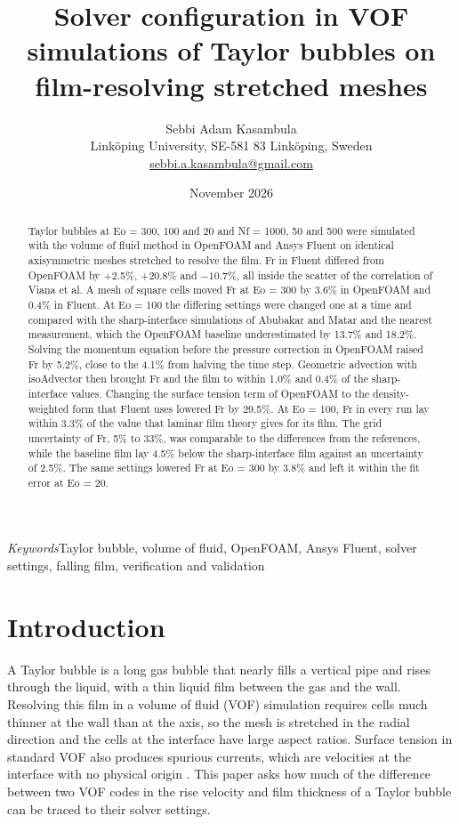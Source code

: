 \documentclass[11pt,a4paper]{article}
\title{Solver configuration in VOF simulations of Taylor bubbles on film-resolving stretched meshes}
\author{Sebbi Adam Kasambula\\[3pt]
{\normalsize Link\"oping University, SE-581 83 Link\"oping, Sweden}\\[1pt]
{\normalsize \href{mailto:sebbi.a.kasambula@gmail.com}{sebbi.a.kasambula@gmail.com}}}
\date{November 2026}
\begin{document}
\maketitle

\begin{abstract}
Taylor bubbles at Eo = 300, 100 and 20 and Nf = 1000, 50 and 500 were simulated with the volume of fluid method in OpenFOAM and Ansys Fluent on identical axisymmetric meshes stretched to resolve the film. Fr in Fluent differed from OpenFOAM by +2.5\%, +20.8\% and $-10.7\%$, all inside the scatter of the correlation of Viana et al. A mesh of square cells moved Fr at Eo = 300 by 3.6\% in OpenFOAM and 0.4\% in Fluent. At Eo = 100 the differing settings were changed one at a time and compared with the sharp-interface simulations of Abubakar and Matar and the nearest measurement, which the OpenFOAM baseline underestimated by 13.7\% and 18.2\%. Solving the momentum equation before the pressure correction in OpenFOAM raised Fr by 5.2\%, close to the 4.1\% from halving the time step. Geometric advection with isoAdvector then brought Fr and the film to within 1.0\% and 0.4\% of the sharp-interface values. Changing the surface tension term of OpenFOAM to the density-weighted form that Fluent uses lowered Fr by 29.5\%. At Eo = 100, Fr in every run lay within 3.3\% of the value that laminar film theory gives for its film. The grid uncertainty of Fr, 5\% to 33\%, was comparable to the differences from the references, while the baseline film lay 4.5\% below the sharp-interface film against an uncertainty of 2.5\%. The same settings lowered Fr at Eo = 300 by 3.8\% and left it within the fit error at Eo = 20.
\end{abstract}

\noindent\textit{Keywords}\quad Taylor bubble, volume of fluid, OpenFOAM, Ansys Fluent, solver settings, falling film, verification and validation

\section{Introduction}

A Taylor bubble is a long gas bubble that nearly fills a vertical pipe and rises through the liquid, with a thin liquid film between the gas and the wall. Resolving this film in a volume of fluid (VOF) simulation \cite{hirt1981volume} requires cells much thinner at the wall than at the axis, so the mesh is stretched in the radial direction and the cells at the interface have large aspect ratios. Surface tension in standard VOF also produces spurious currents, which are velocities at the interface with no physical origin \cite{harvie2006analysis,popinet2018numerical}. This paper asks how much of the difference between two VOF codes in the rise velocity and film thickness of a Taylor bubble can be traced to their solver settings.
\end{document}
